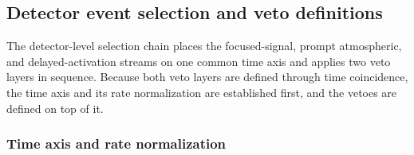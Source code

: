 \documentclass[11pt]{article}
\begin{document}
\subsection{Detector event selection and veto definitions}
\label{sec:selection}

The detector-level selection chain places the focused-signal, prompt
atmospheric, and delayed-activation streams on one common time axis and applies
two veto layers in sequence. Because both veto layers are defined through time
coincidence, the time axis and its rate normalization are established first, and
the vetoes are defined on top of it.

\subsubsection{Time axis and rate normalization}
\end{document}
